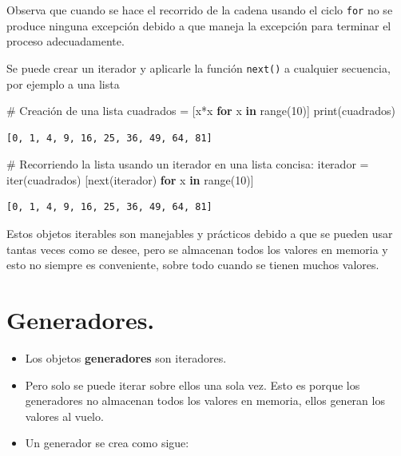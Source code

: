 \documentclass[
  spanish,
  letterpaper,
]{scrbook}
\newenvironment{Shaded}{\begin{snugshade}}{\end{snugshade}}
\newcommand{\BuiltInTok}[1]{\textcolor[rgb]{0.00,0.23,0.31}{#1}}
\newcommand{\CommentTok}[1]{\textcolor[rgb]{0.37,0.37,0.37}{#1}}
\newcommand{\ControlFlowTok}[1]{\textcolor[rgb]{0.00,0.23,0.31}{\textbf{#1}}}
\newcommand{\DecValTok}[1]{\textcolor[rgb]{0.68,0.00,0.00}{#1}}
\newcommand{\KeywordTok}[1]{\textcolor[rgb]{0.00,0.23,0.31}{\textbf{#1}}}
\newcommand{\NormalTok}[1]{\textcolor[rgb]{0.00,0.23,0.31}{#1}}
\newcommand{\OperatorTok}[1]{\textcolor[rgb]{0.37,0.37,0.37}{#1}}
\theoremstyle{definition}
\theoremstyle{remark}
\begin{document}
Observa que cuando se hace el recorrido de la cadena usando el ciclo
\texttt{for} no se produce ninguna excepción debido a que maneja la
excepción para terminar el proceso adecuadamente.

Se puede crear un iterador y aplicarle la función \texttt{next()} a
cualquier secuencia, por ejemplo a una lista

\begin{Shaded}
\begin{Highlighting}[]
\CommentTok{\# Creación de una lista}
\NormalTok{cuadrados }\OperatorTok{=}\NormalTok{ [x}\OperatorTok{*}\NormalTok{x }\ControlFlowTok{for}\NormalTok{ x }\KeywordTok{in} \BuiltInTok{range}\NormalTok{(}\DecValTok{10}\NormalTok{)]}
\BuiltInTok{print}\NormalTok{(cuadrados)}
\end{Highlighting}
\end{Shaded}

\begin{verbatim}
[0, 1, 4, 9, 16, 25, 36, 49, 64, 81]
\end{verbatim}

\begin{Shaded}
\begin{Highlighting}[]
\CommentTok{\# Recorriendo la lista usando un iterador en una lista concisa:}
\NormalTok{iterador }\OperatorTok{=} \BuiltInTok{iter}\NormalTok{(cuadrados)}
\NormalTok{[}\BuiltInTok{next}\NormalTok{(iterador) }\ControlFlowTok{for}\NormalTok{ x }\KeywordTok{in} \BuiltInTok{range}\NormalTok{(}\DecValTok{10}\NormalTok{)]}
\end{Highlighting}
\end{Shaded}

\begin{verbatim}
[0, 1, 4, 9, 16, 25, 36, 49, 64, 81]
\end{verbatim}

Estos objetos iterables son manejables y prácticos debido a que se
pueden usar tantas veces como se desee, pero se almacenan todos los
valores en memoria y esto no siempre es conveniente, sobre todo cuando
se tienen muchos valores.

\section{Generadores.}\label{generadores.}

\begin{itemize}
\item
  Los objetos \textbf{generadores} son iteradores.
\item
  Pero solo se puede iterar sobre ellos una sola vez. Esto es porque los
  generadores no almacenan todos los valores en memoria, ellos generan
  los valores al vuelo.
\item
  Un generador se crea como sigue:
\end{itemize}
\end{document}

